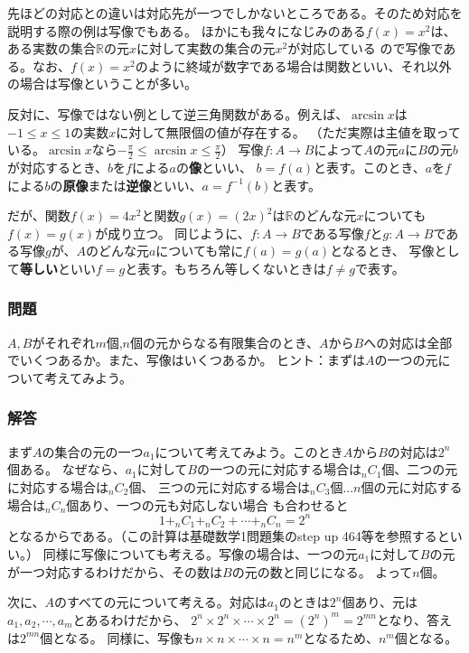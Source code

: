 \documentclass[a4j,dvipdfmx]{jsarticle}
\begin{document}
先ほどの対応との違いは対応先が一つでしかないところである。そのため対応を説明する際の例は写像でもある。
ほかにも我々になじみのある$f(x)=x^2$は、ある実数の集合$\mathbb{R}$の元$x$に対して実数の集合の元$x^2$が対応している
ので写像である。なお、$f(x)=x^2$のように終域が数字である場合は関数といい、それ以外の場合は写像ということが多い。

反対に、写像ではない例として逆三角関数がある。例えば、$\arcsin x$は$-1\leq x\leq 1$の実数$x$に対して無限個の値が存在する。
（ただ実際は主値を取っている。$\arcsin x$なら$-\frac{\pi}{2}\leq \arcsin x\leq \frac{\pi}{2}$）
\newpage
写像$f:A\to B$によって$A$の元$a$に$B$の元$b$が対応するとき、$b$を$f$による$a$の\textbf{像}といい、
$b=f(a)$と表す。このとき、$a$を$f$による$b$の\textbf{原像}または\textbf{逆像}といい、$a=f^{-1}(b)$と表す。

だが、関数$f(x)=4x^2$と関数$g(x)=(2x)^2$は$\mathbb{R}$のどんな元$x$についても$f(x)=g(x)$が成り立つ。
同じように、$f:A\to B$である写像$f$と$g:A\to B$である写像$g$が、$A$のどんな元$a$についても常に$f(a)=g(a)$となるとき、
写像として\textbf{等しい}といい$f=g$と表す。もちろん等しくないときは$f\neq g$で表す。

\subsubsection*{問題}
$A,B$がそれぞれ$m$個,$n$個の元からなる有限集合のとき、$A$から$B$への対応は全部でいくつあるか。また、写像はいくつあるか。
{\scriptsize ヒント：まずは$A$の一つの元について考えてみよう。}
\vspace{70mm}
\subsubsection*{解答}
\color{red}
まず$A$の集合の元の一つ$a_1$について考えてみよう。このとき$A$から$B$の対応は$2^n$個ある。
なぜなら、$a_1$に対して$B$の一つの元に対応する場合は$_nC_1$個、二つの元に対応する場合は$_nC_2$個、
三つの元に対応する場合は$_nC_3$個...$n$個の元に対応する場合は$_nC_n$個あり、一つの元も対応しない場合
も合わせると
\begin{equation*}
    1+_nC_1+_nC_2+\cdots+_nC_n=2^n
\end{equation*}
となるからである。（この計算は基礎数学1問題集のstep up 464等を参照するといい。）
同様に写像についても考える。写像の場合は、一つの元$a_1$に対して$B$の元が一つ対応するわけだから、その数は$B$の元の数と同じになる。
よって$n$個。

次に、$A$のすべての元について考える。対応は$a_1$のときは$2^n$個あり、元は$a_1,a_2,\cdots,a_m$とあるわけだから、
$2^n\times 2^n\times\cdots\times 2^n=(2^n)^m=2^{mn}$となり、答えは$2^{mn}$個となる。
同様に、写像も$n\times n\times\cdots\times n=n^m$となるため、$n^m$個となる。\\\\
\color{black}
\newpage
\end{document}
